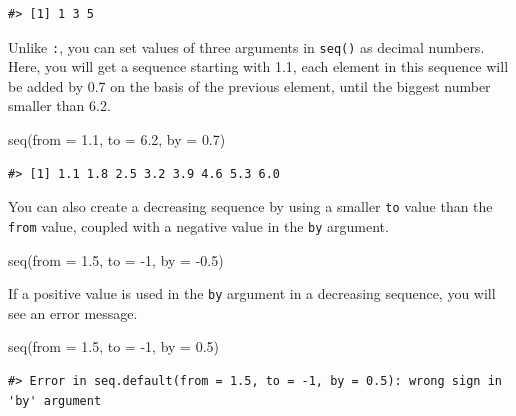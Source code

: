 \documentclass[
]{book}
\newenvironment{Shaded}{\begin{snugshade}}{\end{snugshade}}
\newcommand{\AttributeTok}[1]{\textcolor[rgb]{0.77,0.63,0.00}{#1}}
\newcommand{\DecValTok}[1]{\textcolor[rgb]{0.00,0.00,0.81}{#1}}
\newcommand{\FloatTok}[1]{\textcolor[rgb]{0.00,0.00,0.81}{#1}}
\newcommand{\FunctionTok}[1]{\textcolor[rgb]{0.00,0.00,0.00}{#1}}
\newcommand{\NormalTok}[1]{#1}
\newcommand{\SpecialCharTok}[1]{\textcolor[rgb]{0.00,0.00,0.00}{#1}}
\begin{document}
\begin{verbatim}
#> [1] 1 3 5
\end{verbatim}

Unlike \texttt{:}, you can set values of three arguments in \texttt{seq()} as decimal numbers. Here, you will get a sequence starting with 1.1, each element in this sequence will be added by 0.7 on the basis of the previous element, until the biggest number smaller than 6.2.

\begin{Shaded}
\begin{Highlighting}[]
\FunctionTok{seq}\NormalTok{(}\AttributeTok{from =} \FloatTok{1.1}\NormalTok{, }\AttributeTok{to =} \FloatTok{6.2}\NormalTok{, }\AttributeTok{by =} \FloatTok{0.7}\NormalTok{) }
\end{Highlighting}
\end{Shaded}

\begin{verbatim}
#> [1] 1.1 1.8 2.5 3.2 3.9 4.6 5.3 6.0
\end{verbatim}

You can also create a decreasing sequence by using a smaller \texttt{to} value than the \texttt{from} value, coupled with a negative value in the \texttt{by} argument.

\begin{Shaded}
\begin{Highlighting}[]
\FunctionTok{seq}\NormalTok{(}\AttributeTok{from =} \FloatTok{1.5}\NormalTok{, }\AttributeTok{to =} \SpecialCharTok{{-}}\DecValTok{1}\NormalTok{, }\AttributeTok{by =} \SpecialCharTok{{-}}\FloatTok{0.5}\NormalTok{) }
\end{Highlighting}
\end{Shaded}

If a positive value is used in the \texttt{by} argument in a decreasing sequence, you will see an error message.

\begin{Shaded}
\begin{Highlighting}[]
\FunctionTok{seq}\NormalTok{(}\AttributeTok{from =} \FloatTok{1.5}\NormalTok{, }\AttributeTok{to =} \SpecialCharTok{{-}}\DecValTok{1}\NormalTok{, }\AttributeTok{by =} \FloatTok{0.5}\NormalTok{) }
\end{Highlighting}
\end{Shaded}

\begin{verbatim}
#> Error in seq.default(from = 1.5, to = -1, by = 0.5): wrong sign in 'by' argument
\end{verbatim}
\end{document}
